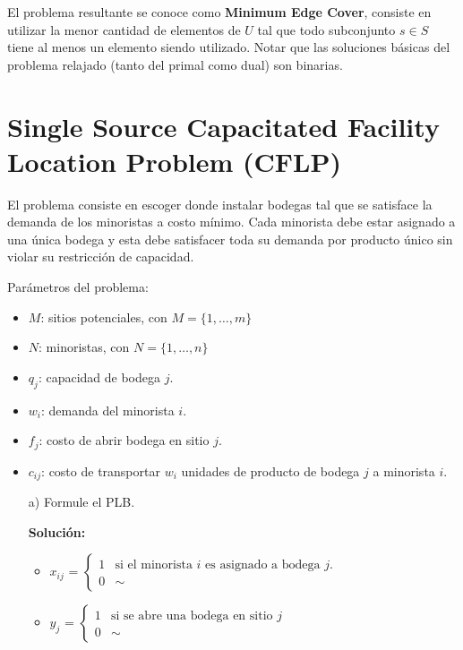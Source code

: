 \documentclass[10pt]{article}
\theoremstyle{plain}
\theoremstyle{definition}
\begin{document}
\begin{itemize}
El problema resultante se conoce como \textbf{Minimum Edge Cover}, consiste en utilizar la menor cantidad de elementos de $U$ tal que todo subconjunto $s \in S$ tiene al menos un elemento siendo utilizado. Notar que las soluciones básicas del problema relajado (tanto del primal como dual) son binarias.

\section{Single Source Capacitated Facility Location Problem (CFLP)}
El problema consiste en escoger donde instalar bodegas tal que se satisface la demanda de los minoristas a costo mínimo. Cada minorista debe estar asignado a una única bodega y esta debe satisfacer toda su demanda por producto único sin violar su restricción de capacidad.

Parámetros del problema:
\begin{itemize}
    \item $M$: sitios potenciales, con $M = \{1, \ldots, m\}$
    \item $N$: minoristas, con $N = \{1, \ldots, n\}$
    \item $q_{j}$: capacidad de bodega $j$.
    \item $w_{i}$: demanda del minorista $i$.
    \item $f_{j}$: costo de abrir bodega en sitio $j$.
    \item $c_{ij}$: costo de transportar $w_{i}$ unidades de producto de bodega $j$ a minorista $i$.
\end{itemize}

\begin{itemize}
    \item[a)] Formule el PLB.

\textbf{Solución:}\\
\begin{itemize}
    \item  $x_{ij}$ = $\begin{cases}
      1 & \text{si el minorista $i$ es asignado a bodega $j$.} \\
      0 & \sim
    \end{cases}$
    \item $y_{j}$ =
    $\begin{cases}
      1 & \text{si se abre una bodega en sitio $j$} \\
      0 & \sim
    \end{cases}$
\end{itemize}


\end{itemize}
\end{itemize}
\end{document}
